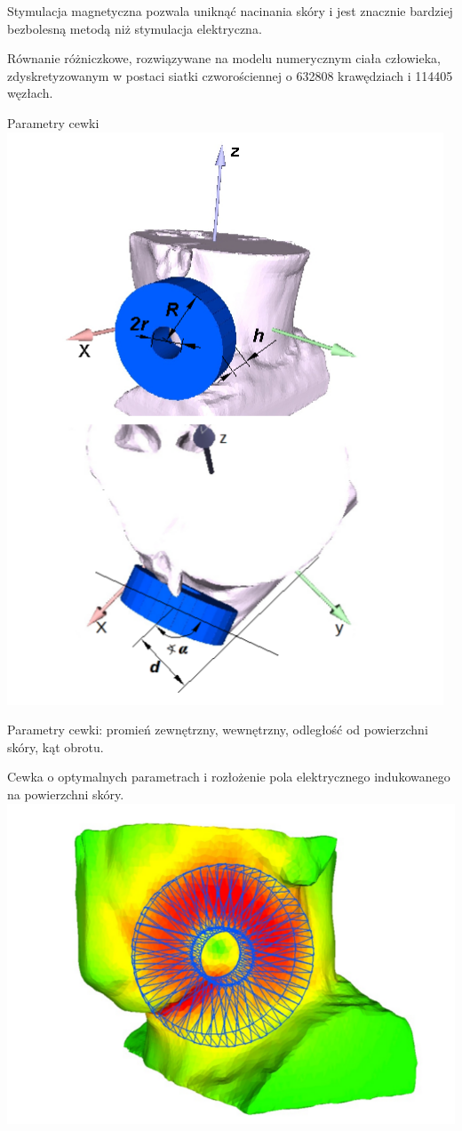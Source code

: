 \documentclass{article}
\begin{document}
Stymulacja magnetyczna pozwala uniknąć nacinania skóry i jest znacznie
bardziej bezbolesną metodą niż stymulacja elektryczna.

Równanie różniczkowe, rozwiązywane na modelu numerycznym ciała
człowieka, zdyskretyzowanym w postaci siatki czworościennej o 632808
krawędziach i 114405 węzłach.

    Parametry cewki \includegraphics{pics/ecjext-param.png}

    Parametry cewki: promień zewnętrzny, wewnętrzny, odległość od
powierzchni skóry, kąt obrotu.

    Cewka o optymalnych parametrach i rozłożenie pola elektrycznego
indukowanego na powierzchni skóry. \includegraphics{pics/ecjext-opt.png}
\end{document}
